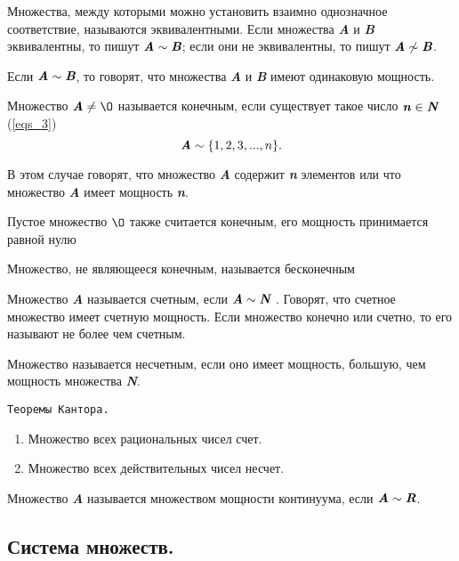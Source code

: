 \documentclass{article}
\begin{document}
    Множества, между которыми можно установить взаимно однозначное соответствие, называются эквивалентными. Если множества \textit{\textbf{A}} и \textit{\textbf{B}} эквивалентны, то пишут  $\textit{\textbf{A}} \sim \textit{\textbf{B}}$; если они не эквивалентны, то пишут $\textit{\textbf{A}} \not\sim \textit{\textbf{B}}$.

    Если $\textit{\textbf{A}} \sim \textit{\textbf{B}}$, то говорят, что множества \textit{\textbf{A}} и \textit{\textbf{B}} имеют одинаковую мощность.

    Множество $\textbf{\textit{A}} \neq \O$ называется конечным, если существует такое число $\textbf{\textit{n}} \in \textbf{\textit{N}}$ (\ref{eqs_3})
    \begin{equation}
        \label{eqs_3}
        \textbf{\textit{A}} \sim \{1,2,3,...,n\}.
    \end{equation}

    В этом случае говорят, что множество \textit{\textbf{A}} содержит \textit{\textbf{n}} элементов или что множество \textit{\textbf{A}} имеет мощность \textit{\textbf{n}}.

    Пустое множество $\O$ также считается конечным, его мощность принимается равной нулю

    Множество, не являющееся конечным, называется бесконечным

    Множество \textit{\textbf{A}} называется счетным, если $\textit{\textbf{A}} \sim \textit{\textbf{N}}$ . Говорят, что
    счетное множество имеет счетную мощность. Если множество конечно или счетно, то его называют не более чем счетным.

    Множество называется несчетным, если оно имеет мощность, большую, чем мощность множества \textit{\textbf{N}}.

    \texttt{Теоремы Кантора.}
    \begin{enumerate}
        \item Множество всех рациональных чисел счет.
        \item Множество всех действительных чисел несчет.
    \end{enumerate}

    Множество \textit{\textbf{A}} называется множеством мощности континуума, если $\textbf{\textit{A}} \sim \textbf{\textit{R}}$.

    \subsection*{Система множеств.}
\end{document}
